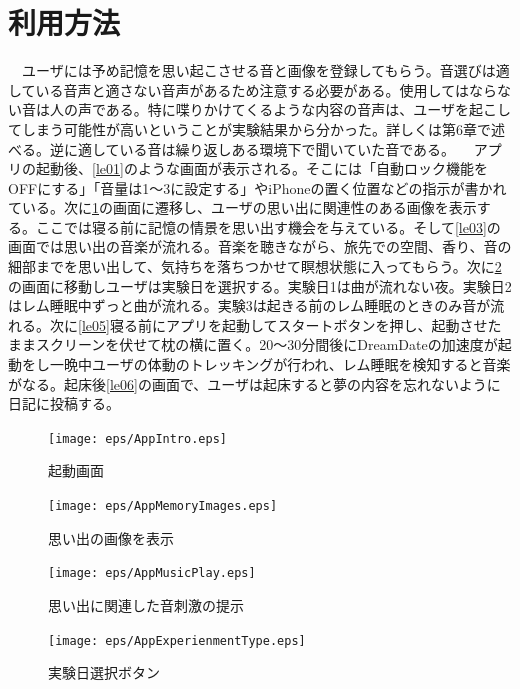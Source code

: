 \section{利用方法}
　ユーザには予め記憶を思い起こさせる音と画像を登録してもらう。音選びは適している音声と適さない音声があるため注意する必要がある。使用してはならない音は人の声である。特に喋りかけてくるような内容の音声は、ユーザを起こしてしまう可能性が高いということが実験結果から分かった。詳しくは第6章で述べる。逆に適している音は繰り返しある環境下で聞いていた音である。
　アプリの起動後、\ref{le01}のような画面が表示される。そこには「自動ロック機能をOFFにする」「音量は1〜3に設定する」やiPhoneの置く位置などの指示が書かれている。次に\ref{le02}の画面に遷移し、ユーザの思い出に関連性のある画像を表示する。ここでは寝る前に記憶の情景を思い出す機会を与えている。そして\ref{le03}の画面では思い出の音楽が流れる。音楽を聴きながら、旅先での空間、香り、音の細部までを思い出して、気持ちを落ちつかせて瞑想状態に入ってもらう。次に\ref{le04}の画面に移動しユーザは実験日を選択する。実験日1は曲が流れない夜。実験日2はレム睡眠中ずっと曲が流れる。実験3は起きる前のレム睡眠のときのみ音が流れる。次に\ref{le05}寝る前にアプリを起動してスタートボタンを押し、起動させたままスクリーンを伏せて枕の横に置く。20〜30分間後にDreamDateの加速度が起動をし一晩中ユーザの体動のトレッキングが行われ、レム睡眠を検知すると音楽がなる。起床後\ref{le06}の画面で、ユーザは起床すると夢の内容を忘れないように日記に投稿する。

\begin{figure}[htbp]
 \begin{minipage}{0.45\hsize}
  \begin{center}
   \texttt{[image: eps/AppIntro.eps]}
  \end{center}
  \caption{起動画面}
  \label{le01}
 \end{minipage}
  \begin{minipage}{0.45\hsize}
  \begin{center}
   \texttt{[image: eps/AppMemoryImages.eps]}
  \end{center}
  \caption{思い出の画像を表示}
  \label{le02}
 \end{minipage}
\end{figure}
\begin{figure}[htbp]
 \begin{minipage}{0.45\hsize}
  \begin{center}
   \texttt{[image: eps/AppMusicPlay.eps]}
  \end{center}
  \caption{思い出に関連した音刺激の提示}
  \label{le03}
 \end{minipage}
 \begin{minipage}{0.45\hsize}
  \begin{center}
   \texttt{[image: eps/AppExperienmentType.eps]}
  \end{center}
  \caption{実験日選択ボタン}
  \label{le04}
 \end{minipage}
\end{figure}

